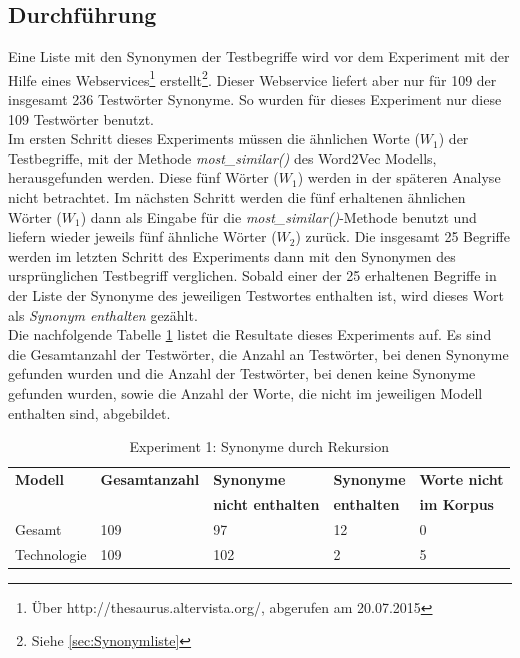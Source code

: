 \documentclass[12pt,a4paper]{report}
\begin{document}
		\subsection*{Durchführung}
		Eine Liste mit den Synonymen der Testbegriffe wird vor dem Experiment mit der Hilfe eines Webservices\footnote{Über http://thesaurus.altervista.org/, abgerufen am 20.07.2015} erstellt\footnote{Siehe \ref{sec:Synonymliste}}. Dieser Webservice liefert aber nur für 109 der insgesamt 236 Testwörter Synonyme. So wurden für dieses Experiment nur diese 109 Testwörter benutzt.\\
		Im ersten Schritt dieses Experiments müssen die ähnlichen Worte ($W_1$) der Testbegriffe, mit der Methode \textit{most\_similar()} des Word2Vec Modells, herausgefunden werden. Diese fünf Wörter ($W_1$) werden in der späteren Analyse nicht betrachtet. Im nächsten Schritt werden die fünf erhaltenen ähnlichen Wörter ($W_1$) dann als Eingabe für die \textit{most\_similar()}-Methode benutzt und liefern wieder jeweils fünf ähnliche Wörter ($W_2$) zurück. Die insgesamt 25 Begriffe werden im letzten Schritt des Experiments dann mit den Synonymen des ursprünglichen Testbegriff verglichen. Sobald einer der 25 erhaltenen Begriffe in der Liste der Synonyme des jeweiligen Testwortes enthalten ist, wird dieses Wort als \textit{Synonym enthalten} gezählt.\\
		Die nachfolgende Tabelle \ref{tab:experiment1} listet die Resultate dieses Experiments auf. Es sind die Gesamtanzahl der Testwörter, die Anzahl an Testwörter, bei denen Synonyme gefunden wurden und die Anzahl der Testwörter, bei denen keine Synonyme gefunden wurden, sowie die Anzahl der Worte, die nicht im jeweiligen Modell enthalten sind, abgebildet.
		
		

		
		
\begin{table}[H]
\caption{Experiment 1: Synonyme durch Rekursion}
\label{tab:experiment1}
\begin{center}
\begin{tabular}{|l||l|l|l|l|}
\hline
\textbf{Modell} & \textbf{Gesamtanzahl}	&\textbf{Synonyme} & \textbf{Synonyme}  & \textbf{Worte nicht}  \\
 &			& \textbf{nicht enthalten} & \textbf{enthalten} & \textbf{im Korpus}  \\

\hline
 Gesamt & 109 & 97 & 12 & 0 \\
 \hline
 Technologie & 109 & 102 & 2 & 5 \\
 \hline
 
\end{tabular}
\end{center}
\end{table}
		
\end{document}
